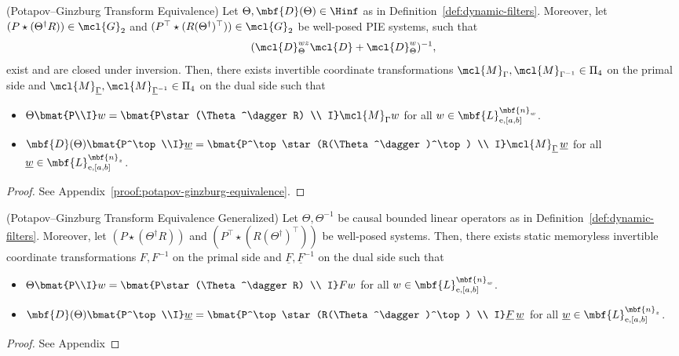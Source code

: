 \begin{lemma} (Potapov--Ginzburg Transform Equivalence)\label{lem:potapov-ginzburg-equivalence}
Let $\Theta, \mbf{D}(\Theta)\in \Hinf$ as in Definition~\ref{def:dynamic-filters}. Moreover, let $(P\star(\Theta^\dagger R))\in\mcl{G}_2$
and $(P^\top\star(R(\Theta^\dagger)^\top))\in\mcl{G}_2$ be well-posed PIE systems, such that
\[
(\mcl{D}_{\Theta}^{wz} \mcl{D} + \mcl{D}_{\Theta}^w)^{-1},
\]
exist and are closed under inversion. Then, there exists invertible coordinate transformations $\mcl{M}_{\Gamma},\mcl{M}_{\Gamma^{-1}}\in\Pi_4$ on the primal side and
$\mcl{M}_{\underline{\Gamma}},\mcl{M}_{\underline{\Gamma}^{-1}}\in\Pi_4$ on the dual side such that
\begin{itemize}
    \item $\Theta\bmat{P\\I} w = \bmat{P\star(\Theta^\dagger R) \\ I}\mcl{M}_{\Gamma} w$ for all $w\in\mbf{L}_{\mathrm{e},[a,b]}^{\mbf{n}_w}$.
    \item $\mbf{D}(\Theta)\bmat{P^\top\\I} \underline{w} = \bmat{P^\top\star(R(\Theta^\dagger)^\top) \\ I}\mcl{M}_{\underline{\Gamma}}\,\underline{w}$ for all $\underline{w}\in\mbf{L}_{\mathrm{e},[a,b]}^{\mbf{n}_z}$.
\end{itemize}
\end{lemma}
\begin{proof}
See Appendix~\ref{proof:potapov-ginzburg-equivalence}.
\end{proof}

\begin{lemma} (Potapov--Ginzburg Transform Equivalence Generalized)
Let $\Theta, \Theta^{-1}$ be causal bounded linear operators as in Definition~\ref{def:dynamic-filters}. Moreover, let $(P\star(\Theta^\dagger R))$
and $(P^\top\star(R(\Theta^\dagger)^\top))$ be well-posed systems. Then, there exists static memoryless invertible coordinate transformations 
$F,F^{-1}$ on the primal side and
$\underline{F},\underline{F}^{-1}$ on the dual side such that
\begin{itemize}
    \item $\Theta\bmat{P\\I} w = \bmat{P\star(\Theta^\dagger R) \\ I}F w$ for all $w\in\mbf{L}_{\mathrm{e},[a,b]}^{\mbf{n}_w}$.
    \item $\mbf{D}(\Theta)\bmat{P^\top\\I} \underline{w} = \bmat{P^\top\star(R(\Theta^\dagger)^\top) \\ I}\underline{F}\,\underline{w}$ for all $\underline{w}\in\mbf{L}_{\mathrm{e},[a,b]}^{\mbf{n}_z}$.
\end{itemize}
\end{lemma}
\begin{proof}
See Appendix
\end{proof}


